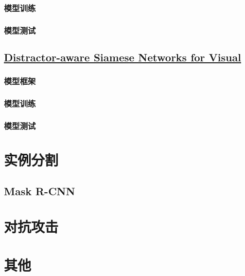 \documentclass[]{article}
\begin{document}
\subsubsection{模型训练}
\subsubsection{模型测试}

\subsection{\href{./papers/Distractor-aware Siamese Networks for Visual.pdf}{Distractor-aware Siamese Networks for Visual}}
\subsubsection{模型框架}
\subsubsection{模型训练}
\subsubsection{模型测试}

\section{实例分割}
\subsection{Mask R-CNN}

\section{对抗攻击}
\section{其他}
\end{document}
